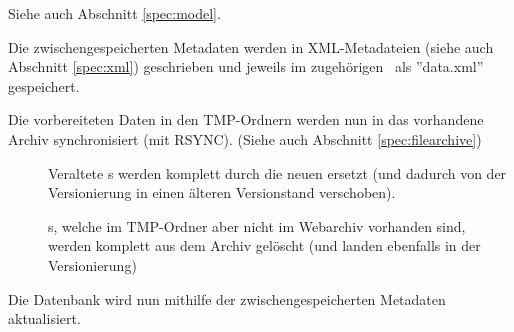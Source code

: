\begin{description}
		Siehe auch Abschnitt \ref{spec:model}.
	\item [\req{Erzeugung von XML-Dateien}{xml}]
		Die zwischengespeicherten Metadaten werden in XML-Metadateien 
		(siehe auch Abschnitt \ref{spec:xml}) 
		geschrieben und jeweils im zugehörigen \arc\ als ''data.xml'' gespeichert. 
	\item [\req{Synchronisation}{sync}]
		Die vorbereiteten Daten in den TMP-Ordnern werden nun in das vorhandene Archiv synchronisiert 
		(mit RSYNC). (Siehe auch Abschnitt \ref{spec:filearchive})
		\begin{description}
			\item []
				Veraltete \arc s werden komplett durch die neuen ersetzt
				(und dadurch von der Versionierung in einen älteren Versionstand verschoben).
			\item []
				\arc s, welche im TMP-Ordner aber nicht im Webarchiv vorhanden sind, werden
				komplett aus dem Archiv gelöscht (und landen ebenfalls in der Versionierung)
		\end{description}
	\item [\req{Datenbankaktualisierung}{dbupdate}]
		Die Datenbank wird nun mithilfe der zwischengespeicherten Metadaten aktualisiert.
\end{description}

